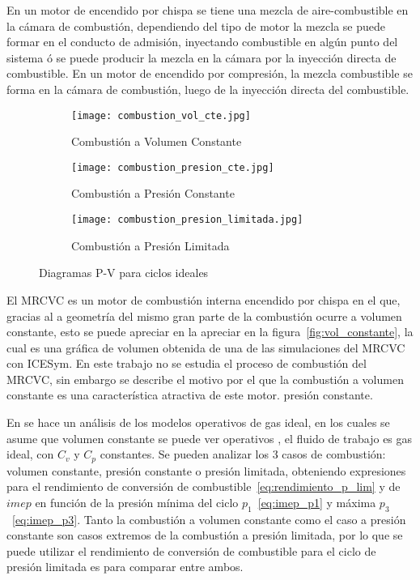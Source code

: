 En un motor de encendido por chispa se tiene una mezcla de aire-combustible en
la cámara de combustión, dependiendo del tipo de motor la mezcla se puede formar
en el conducto de admisión, inyectando combustible en algún punto del sistema ó
se puede producir la mezcla en la cámara por la inyección directa de
combustible.
%
En un motor de encendido por compresión, la mezcla combustible se forma en la
cámara de combustión, luego de la inyección directa del combustible.

\begin{figure} \centering
    \begin{subfigure}{0.4\textwidth} \centering
\texttt{[image: combustion\_vol\_cte.jpg]}
        \caption{Combustión a Volumen Constante}
    \end{subfigure} \hfill
    \begin{subfigure}{0.4\textwidth} \centering
\texttt{[image: combustion\_presion\_cte.jpg]}
        \caption{Combustión a Presión Constante}
    \end{subfigure} \hfill
    \begin{subfigure}{0.4\textwidth} \centering
\texttt{[image: combustion\_presion\_limitada.jpg]}
        \caption{Combustión a Presión Limitada}
    \end{subfigure}
    \caption{Diagramas P-V para ciclos
ideales\parencite{heywood}}\label{fig:ciclos_ideales}
\end{figure}

El MRCVC es un motor de combustión interna encendido por chispa en el que,
gracias al a geometría del mismo gran parte de la combustión ocurre a volumen
constante, esto se puede apreciar en la apreciar en la
figura~\ref{fig:vol_constante}, la cual es una gráfica de volumen obtenida de
una de las simulaciones del MRCVC con ICESym.
%
En este trabajo no se estudia el proceso de combustión del MRCVC, sin embargo se
describe el motivo por el que la combustión a volumen constante es una
característica atractiva de este motor.  %
presión constante.

En \parencite{heywood} se hace un análisis de los modelos operativos de gas
ideal, en los cuales se asume que %
volumen constante se puede ver %
operativos \parencite{heywood}, el fluido de trabajo es gas ideal, con $C_v$ y
$C_p$ constantes.
%
Se pueden analizar los 3 casos de combustión: volumen constante, presión
constante o presión limitada, obteniendo expresiones para el rendimiento de
conversión de combustible~\ref{eq:rendimiento_p_lim} y de $imep$ en función de
la presión mínima del ciclo $p_1$~\ref{eq:imep_p1} y máxima
$p_3$~\ref{eq:imep_p3}.
%
Tanto la combustión a volumen constante como el caso a presión constante son
casos extremos de la combustión a presión limitada, por lo que se puede utilizar
el rendimiento de conversión de combustible para el ciclo de presión limitada es
para comparar entre ambos.

